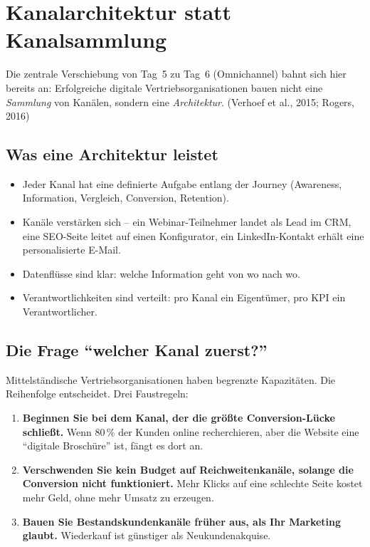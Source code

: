 \documentclass[11pt,a4paper,oneside]{article}
\newcommand{\quelle}[1]{{\footnotesize\color{lpGray}(#1)}}
\begin{document}
\section{Kanalarchitektur statt Kanalsammlung}

Die zentrale Verschiebung von Tag~5 zu Tag~6 (Omnichannel) bahnt sich hier bereits an: Erfolgreiche digitale Vertriebsorganisationen bauen nicht eine \emph{Sammlung} von Kanälen, sondern eine \emph{Architektur}. \quelle{Verhoef et al., 2015; Rogers, 2016}

\subsection{Was eine Architektur leistet}

\begin{itemize}
  \item Jeder Kanal hat eine definierte Aufgabe entlang der Journey (Awareness, Information, Vergleich, Conversion, Retention).
  \item Kanäle verstärken sich -- ein Webinar-Teilnehmer landet als Lead im CRM, eine SEO-Seite leitet auf einen Konfigurator, ein LinkedIn-Kontakt erhält eine personalisierte E-Mail.
  \item Datenflüsse sind klar: welche Information geht von wo nach wo.
  \item Verantwortlichkeiten sind verteilt: pro Kanal ein Eigentümer, pro KPI ein Verantwortlicher.
\end{itemize}

\subsection{Die Frage ``welcher Kanal zuerst?''}

Mittelständische Vertriebsorganisationen haben begrenzte Kapazitäten. Die Reihenfolge entscheidet. Drei Faustregeln:

\begin{enumerate}
  \item \textbf{Beginnen Sie bei dem Kanal, der die größte Conversion-Lücke schließt.} Wenn 80\,\% der Kunden online recherchieren, aber die Website eine ``digitale Broschüre'' ist, fängt es dort an.
  \item \textbf{Verschwenden Sie kein Budget auf Reichweitenkanäle, solange die Conversion nicht funktioniert.} Mehr Klicks auf eine schlechte Seite kostet mehr Geld, ohne mehr Umsatz zu erzeugen.
  \item \textbf{Bauen Sie Bestandskundenkanäle früher aus, als Ihr Marketing glaubt.} Wiederkauf ist günstiger als Neukundenakquise.
\end{enumerate}
\end{document}
